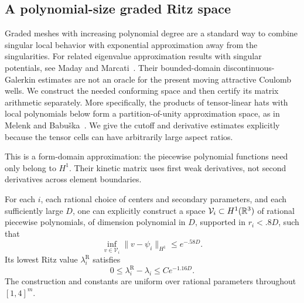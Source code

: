 \subsection{A polynomial-size graded Ritz space}

Graded meshes with increasing polynomial degree are a standard way to
combine singular local behavior with exponential approximation away from
the singularities. For related eigenvalue approximation results with
singular potentials, see Maday and Marcati~\cite{MadayMarcati2019}.
Their bounded-domain discontinuous-Galerkin estimates are not an oracle
for the present moving attractive Coulomb wells. We construct the needed
conforming space and then certify its matrix arithmetic separately.
More specifically, the products of tensor-linear hats with local
polynomials below form a partition-of-unity approximation space, as in
Melenk and Babu\v{s}ka~\cite[Section~2]{MelenkBabuska1996}.
We give the cutoff and derivative estimates explicitly because the tensor
cells can have arbitrarily large aspect ratios.

This is a form-domain approximation: the piecewise polynomial
functions need only belong to \(H^1\). Their kinetic matrix uses first
weak derivatives, not second derivatives across element boundaries.

\begin{lemma}
\label{lem:wells-ritz-approximation}
For each \(i\), each rational choice of centers and secondary parameters,
and each sufficiently large \(D\), one can explicitly construct a space
\(\mathcal V_i\subset H^1(\mathbb R^3)\) of rational piecewise polynomials,
of dimension polynomial in \(D\), supported in \(r_i<.8D\), such that
\begin{equation}
 \inf_{v\in\mathcal V_i}\|v-\psi_i\|_{H^1}\le e^{-.58D}.
 \label{eq:wells-ritz-h1}
\end{equation}
Its lowest Ritz value \(\lambda_i^{\mathrm R}\) satisfies
\begin{equation}
 0\le\lambda_i^{\mathrm R}-\lambda_i\le C e^{-1.16D}.
 \label{eq:wells-ritz-bias}
\end{equation}
The construction and constants are uniform over rational parameters
throughout \([1,4]^m\).
\end{lemma}


